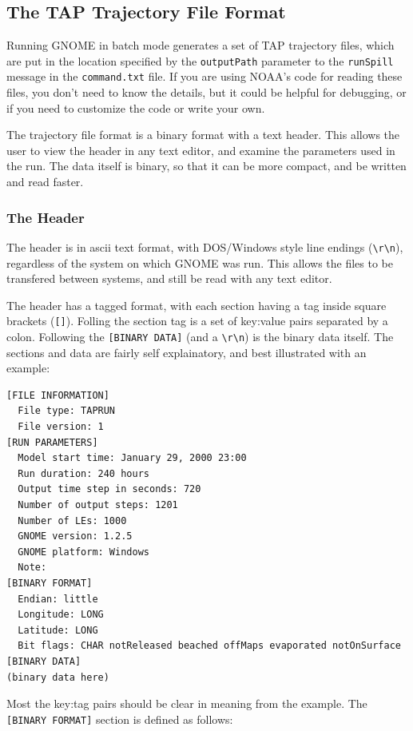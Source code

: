 \documentclass[12pt]{article}      %
\newcommand{\tap}{\textsf{TAP}\xspace}
\newcommand{\gnome}{\textsf{GNOME}\xspace}
\newcommand{\filename}[1]{\texttt{#1}}
\newcommand{\command}[1]{\texttt{#1}}
\begin{document}
\subsection{The \tap Trajectory File Format}\label{sec:TrajFile}
Running \gnome in batch mode generates a set of \tap trajectory files,
which are put in the location specified by the \command{outputPath}
parameter to the \command{runSpill} message in the
\filename{command.txt} file. If you are using NOAA's code for reading
these files, you don't need to know the details, but it could be helpful
for debugging, or if you need to customize the code or write your own.

The trajectory file format is a binary format with a text header. This
allows the user to view the header in any text editor, and examine the
parameters used in the run. The data itself is binary, so that it can be
more compact, and be written and read faster.

\subsubsection{The Header}
The header is in ascii text format, with DOS/Windows style line endings
(\verb+\r\n+), regardless of the system on which \gnome was run. This
allows the files to be transfered between systems, and still be read
with any text editor.

The header has a tagged format, with each section having a tag inside
square brackets (\verb+[]+). Folling the section tag is a set of
key:value pairs separated by a colon. Following the \command{[BINARY
  DATA]} (and a \verb+\r\n+) is the binary data itself. The sections and
data are fairly self explainatory, and best illustrated with an example:

\begin{verbatim}
[FILE INFORMATION]
  File type: TAPRUN
  File version: 1
[RUN PARAMETERS]
  Model start time: January 29, 2000 23:00
  Run duration: 240 hours
  Output time step in seconds: 720
  Number of output steps: 1201
  Number of LEs: 1000
  GNOME version: 1.2.5
  GNOME platform: Windows
  Note:
[BINARY FORMAT]
  Endian: little
  Longitude: LONG
  Latitude: LONG
  Bit flags: CHAR notReleased beached offMaps evaporated notOnSurface
[BINARY DATA]
(binary data here)
\end{verbatim}

Most the key:tag pairs should be clear in meaning from the example. The
\command{[BINARY FORMAT]} section is defined as follows:
\end{document}
